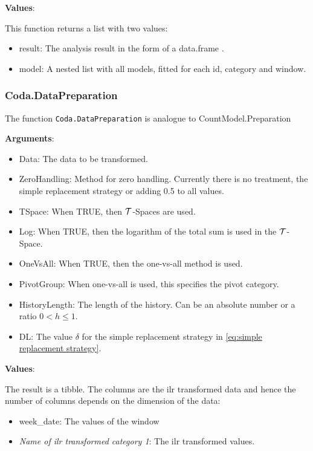 \textbf{Values}:

This function returns a list with two values:

\begin{itemize}
	\item result: The analysis result in the form of a data.frame . 
	\item model: A nested list with all models, fitted for each id, category and window.
\end{itemize}

\subsubsection{Coda.DataPreparation}
\label{sec:Coda.DataPreparation}

The function \texttt{Coda.DataPreparation} is analogue to CountModel.Preparation

\textbf{Arguments}:
\begin{itemize}
  \item Data: The data to be transformed.
  \item ZeroHandling: Method for zero handling.  Currently there is no treatment, the simple replacement strategy or adding 0.5 to all values. 
  \item TSpace: When TRUE, then $\mathcal{T}$-Spaces are used.
  \item Log: When TRUE, then the logarithm of the total sum is used in the $\mathcal{T}$-Space.
  \item OneVsAll: When TRUE, then the one-vs-all method is used.
  \item PivotGroup: When one-vs-all is used, this specifies the pivot category.
  \item HistoryLength: The length of the history. Can be an absolute number or a ratio $0<h\leq 1$.
	\item DL: The value $\delta$ for the simple replacement strategy in \ref{eq:simple replacement strategy}. 
\end{itemize}

\textbf{Values}:

The result is a tibble. The columns are the ilr transformed data and hence the number of columns depends on the dimension of the data:

\begin{itemize}
	\item week\_date: The values of the window
	\item \textit{Name of ilr transformed category 1}: The ilr transformed values.
\end{itemize}

